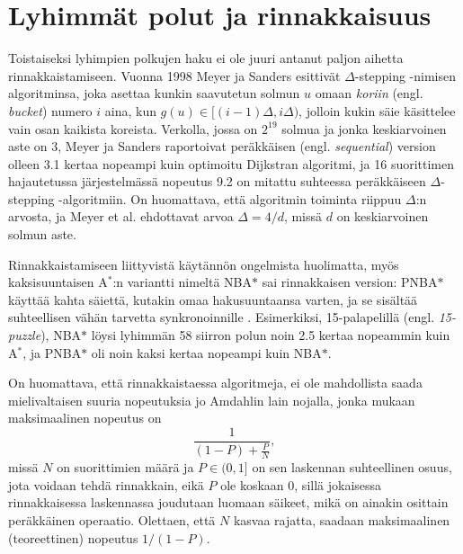 \documentclass[finnish]{tktltiki2}
\theoremstyle{definition}
\theoremstyle{remark}
\begin{document}
\section{Lyhimmät polut ja rinnakkaisuus}
\label{sec:parallel}
Toistaiseksi lyhimpien polkujen haku ei ole juuri antanut paljon aihetta rinnakkaistamiseen. Vuonna 1998 Meyer ja Sanders esittivät $\Delta$-stepping -nimisen algoritminsa, joka asettaa kunkin saavutetun solmun $u$ omaan \textit{koriin} (engl. \textit{bucket}) numero $i$ aina, kun $g(u) \in [(i - 1)\Delta, i\Delta)$, jolloin kukin säie käsittelee vain osan kaikista koreista. 
Verkolla, jossa on $2^{19}$ solmua ja jonka keskiarvoinen aste on 3, Meyer ja Sanders raportoivat peräkkäisen (engl. \textit{sequential}) version olleen 3.1 kertaa nopeampi kuin optimoitu Dijkstran algoritmi, ja 16 suorittimen hajautetussa järjestelmässä nopeutus 9.2 on mitattu suhteessa peräkkäiseen $\Delta$-stepping -algoritmiin. On huomattava, että algoritmin toiminta riippuu $\Delta$:n arvosta, ja Meyer et al. ehdottavat arvoa $\Delta = 4/d$, missä $d$ on keskiarvoinen solmun aste.

Rinnakkaistamiseen liittyvistä käytännön ongelmista huolimatta, myös kaksisuuntaisen A$^{\ast}$:n variantti nimeltä NBA$\ast$ sai rinnakkaisen version: PNBA$\ast$ käyttää kahta säiettä, kutakin omaa hakusuuntaansa varten, ja se sisältää suhteellisen vähän tarvetta synkronoinnille \cite{Rios}. Esimerkiksi, 15-palapelillä (engl. \textit{15-puzzle}), NBA$\ast$ löysi lyhimmän 58 siirron polun noin 2.5 kertaa nopeammin kuin A$^{\ast}$, ja PNBA$\ast$ oli noin kaksi kertaa nopeampi kuin NBA$\ast$.

On huomattava, että rinnakkaistaessa algoritmeja, ei ole mahdollista saada mielivaltaisen suuria nopeutuksia jo Amdahlin lain nojalla, jonka mukaan maksimaalinen nopeutus on
\[
\frac{1}{(1 - P) + \frac{P}{N}},
\]
missä $N$ on suorittimien määrä ja $P \in (0, 1]$ on sen laskennan suhteellinen osuus, jota voidaan tehdä rinnakkain, eikä $P$ ole koskaan 0, sillä jokaisessa rinnakkaisessa laskennassa joudutaan luomaan säikeet, mikä on ainakin osittain peräkkäinen operaatio. Olettaen, että $N$ kasvaa rajatta, saadaan maksimaalinen (teoreettinen) nopeutus $1 / (1 - P)$.
\end{document}
